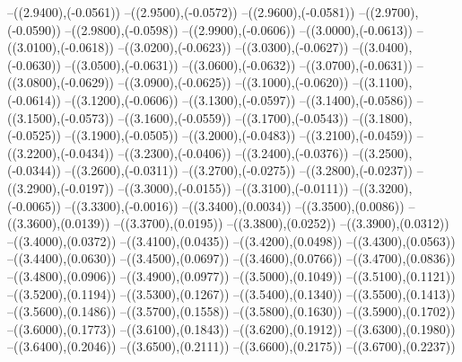 {	--({\sx*(2.9400)},{\sy*(-0.0561)})
	--({\sx*(2.9500)},{\sy*(-0.0572)})
	--({\sx*(2.9600)},{\sy*(-0.0581)})
	--({\sx*(2.9700)},{\sy*(-0.0590)})
	--({\sx*(2.9800)},{\sy*(-0.0598)})
	--({\sx*(2.9900)},{\sy*(-0.0606)})
	--({\sx*(3.0000)},{\sy*(-0.0613)})
	--({\sx*(3.0100)},{\sy*(-0.0618)})
	--({\sx*(3.0200)},{\sy*(-0.0623)})
	--({\sx*(3.0300)},{\sy*(-0.0627)})
	--({\sx*(3.0400)},{\sy*(-0.0630)})
	--({\sx*(3.0500)},{\sy*(-0.0631)})
	--({\sx*(3.0600)},{\sy*(-0.0632)})
	--({\sx*(3.0700)},{\sy*(-0.0631)})
	--({\sx*(3.0800)},{\sy*(-0.0629)})
	--({\sx*(3.0900)},{\sy*(-0.0625)})
	--({\sx*(3.1000)},{\sy*(-0.0620)})
	--({\sx*(3.1100)},{\sy*(-0.0614)})
	--({\sx*(3.1200)},{\sy*(-0.0606)})
	--({\sx*(3.1300)},{\sy*(-0.0597)})
	--({\sx*(3.1400)},{\sy*(-0.0586)})
	--({\sx*(3.1500)},{\sy*(-0.0573)})
	--({\sx*(3.1600)},{\sy*(-0.0559)})
	--({\sx*(3.1700)},{\sy*(-0.0543)})
	--({\sx*(3.1800)},{\sy*(-0.0525)})
	--({\sx*(3.1900)},{\sy*(-0.0505)})
	--({\sx*(3.2000)},{\sy*(-0.0483)})
	--({\sx*(3.2100)},{\sy*(-0.0459)})
	--({\sx*(3.2200)},{\sy*(-0.0434)})
	--({\sx*(3.2300)},{\sy*(-0.0406)})
	--({\sx*(3.2400)},{\sy*(-0.0376)})
	--({\sx*(3.2500)},{\sy*(-0.0344)})
	--({\sx*(3.2600)},{\sy*(-0.0311)})
	--({\sx*(3.2700)},{\sy*(-0.0275)})
	--({\sx*(3.2800)},{\sy*(-0.0237)})
	--({\sx*(3.2900)},{\sy*(-0.0197)})
	--({\sx*(3.3000)},{\sy*(-0.0155)})
	--({\sx*(3.3100)},{\sy*(-0.0111)})
	--({\sx*(3.3200)},{\sy*(-0.0065)})
	--({\sx*(3.3300)},{\sy*(-0.0016)})
	--({\sx*(3.3400)},{\sy*(0.0034)})
	--({\sx*(3.3500)},{\sy*(0.0086)})
	--({\sx*(3.3600)},{\sy*(0.0139)})
	--({\sx*(3.3700)},{\sy*(0.0195)})
	--({\sx*(3.3800)},{\sy*(0.0252)})
	--({\sx*(3.3900)},{\sy*(0.0312)})
	--({\sx*(3.4000)},{\sy*(0.0372)})
	--({\sx*(3.4100)},{\sy*(0.0435)})
	--({\sx*(3.4200)},{\sy*(0.0498)})
	--({\sx*(3.4300)},{\sy*(0.0563)})
	--({\sx*(3.4400)},{\sy*(0.0630)})
	--({\sx*(3.4500)},{\sy*(0.0697)})
	--({\sx*(3.4600)},{\sy*(0.0766)})
	--({\sx*(3.4700)},{\sy*(0.0836)})
	--({\sx*(3.4800)},{\sy*(0.0906)})
	--({\sx*(3.4900)},{\sy*(0.0977)})
	--({\sx*(3.5000)},{\sy*(0.1049)})
	--({\sx*(3.5100)},{\sy*(0.1121)})
	--({\sx*(3.5200)},{\sy*(0.1194)})
	--({\sx*(3.5300)},{\sy*(0.1267)})
	--({\sx*(3.5400)},{\sy*(0.1340)})
	--({\sx*(3.5500)},{\sy*(0.1413)})
	--({\sx*(3.5600)},{\sy*(0.1486)})
	--({\sx*(3.5700)},{\sy*(0.1558)})
	--({\sx*(3.5800)},{\sy*(0.1630)})
	--({\sx*(3.5900)},{\sy*(0.1702)})
	--({\sx*(3.6000)},{\sy*(0.1773)})
	--({\sx*(3.6100)},{\sy*(0.1843)})
	--({\sx*(3.6200)},{\sy*(0.1912)})
	--({\sx*(3.6300)},{\sy*(0.1980)})
	--({\sx*(3.6400)},{\sy*(0.2046)})
	--({\sx*(3.6500)},{\sy*(0.2111)})
	--({\sx*(3.6600)},{\sy*(0.2175)})
	--({\sx*(3.6700)},{\sy*(0.2237)})
}
